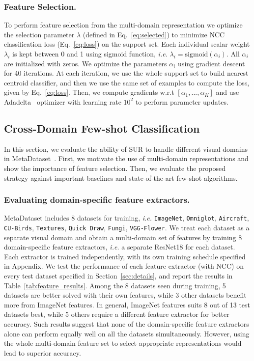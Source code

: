 \documentclass[runningheads]{llncs}
\begin{document}
\subsubsection{Feature Selection.} To perform feature selection from the
multi-domain representation we optimize the selection parameter ${\lambda}$
(defined in Eq.~\ref{eq:selected}) to minimize NCC classification loss
(Eq.~\ref{eq:loss}) on the support set. Each individual scalar weight
$\lambda_i$ is kept between 0 and 1 using sigmoid function, \textit{i.e.} $\lambda_i =
\text{sigmoid}(\alpha_i)$. All $\alpha_i$ are initialized with zeros. We
optimize the parameters $\alpha_i$ using gradient descent for 40
iterations. At each iteration, we use the whole support set to build nearest
centroid classifier, and then we use the same set of examples to compute the
loss, given by Eq.~\ref{eq:loss}. Then, we compute gradients w.r.t $[\alpha_1,
..., \alpha_K]$ and use Adadelta~\cite{zeiler2012adadelta} optimizer with
learning rate $10^2$ to perform parameter updates.

\subsection{Cross-Domain Few-shot Classification}\label{sec:cross_domain}
In this section, we evaluate the ability of SUR to handle different visual
domains in MetaDataset~\cite{triantafillou2019meta}. First, we motivate the use
of multi-domain representations and show the importance of feature selection. Then,
we evaluate the proposed strategy against important baselines and
state-of-the-art few-shot algorithms.

\subsubsection{Evaluating domain-specific feature extractors.}
MetaDataset includes 8 datasets for training, \textit{i.e.} \texttt{ImageNet},
\texttt{Omniglot}, \texttt{Aircraft}, \texttt{CU-Birds}, \texttt{Textures},
\texttt{Quick Draw}, \texttt{Fungi}, \texttt{VGG-Flower}. We treat each dataset
as a separate visual domain and obtain a multi-domain set of features by training 8
domain-specific feature extractors, \textit{i.e.} a separate ResNet18 for each dataset.
Each extractor is trained independently, with its own
training schedule specified in Appendix. We test the performance of each feature
extractor (with NCC) on every test dataset specified in
Section~\ref{sec:details}, and report the results in
Table~\ref{tab:feature_results}. Among the 8 datasets seen during training, 5
datasets are better solved with their own features, while 3 other datasets
benefit more from ImageNet features. In general, ImageNet features suits 8
out of 13 test datasets best, while 5 others require a different feature extractor
for better accuracy.
Such results suggest that none of the domain-specific feature extractors alone
can perform equally well on all the datasets simultaneously. However, using the
whole multi-domain feature set to select appropriate representations would lead to
superior accuracy.
\end{document}
